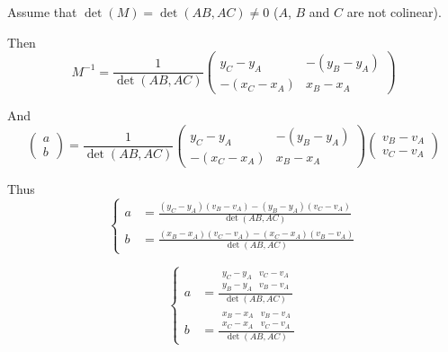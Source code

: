 Assume that $\det(M) = \det(AB,AC) \neq 0$ (\ie $A$, $B$ and $C$ are
not colinear).

Then 
\begin{displaymath}
  M^{-1} =
  \frac{1}{\det(AB,AC)}
  \left(
    \begin{array}{cc}
      y_C - y_A & - (y_B - y_A) \\
      - (x_C - x_A) & x_B - x_A
    \end{array}
  \right)
\end{displaymath}
  
And
\begin{displaymath}
  \left(
    \begin{array}{c}
      a \\
      b 
    \end{array}
  \right)
  =
  \frac{1}{\det(AB,AC)}
  \left(
    \begin{array}{cc}
      y_C - y_A & - (y_B - y_A) \\
      - (x_C - x_A) & x_B - x_A
    \end{array}
  \right)
  \left(
    \begin{array}{c}
      v_B - v_A \\
      v_C - v_A
    \end{array}
  \right)
\end{displaymath}

Thus
\begin{displaymath}
  \left\{
    \begin{aligned}
      a & = \frac{(y_C - y_A)(v_B - v_A) - (y_B - y_A)(v_C - v_A)}{\det(AB,AC)} \\
      b & = \frac{(x_B - x_A)(v_C - v_A) - (x_C - x_A)(v_B - v_A)}{\det(AB,AC)}
    \end{aligned}
  \right.
\end{displaymath}

\ie
\begin{displaymath}
  \left\{
    \begin{aligned}
      a & = \frac{\begin{array}{|cc|}
          y_C - y_A & v_C - v_A \\
          y_B - y_A & v_B - v_A
        \end{array}}{\det(AB,AC)} \\
      b & = \frac{\begin{array}{|cc|}
          x_B - x_A & v_B - v_A \\
          x_C - x_A & v_C - v_A 
        \end{array}}{\det(AB,AC)}
    \end{aligned}
  \right.
\end{displaymath}

